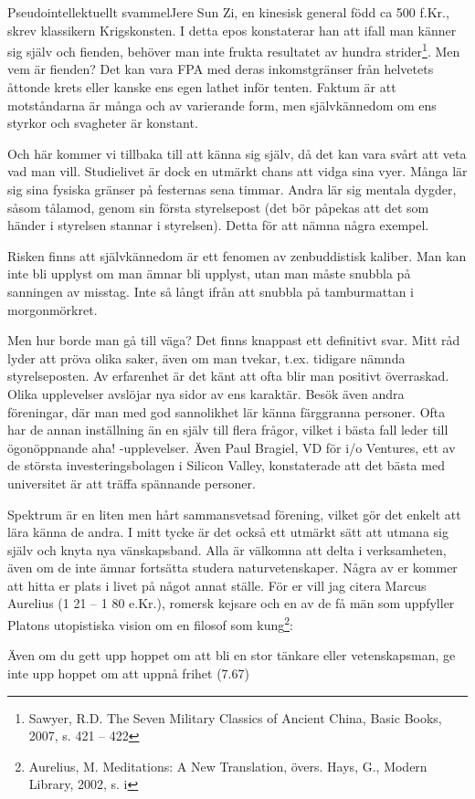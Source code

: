 \documentclass{spektraklet}
\begin{document}
\begin{artikel}{Pseudointellektuellt svammel}{Jere}
Sun Zi, en kinesisk general född ca 500 f.Kr., skrev klassikern Krigskonsten. I detta epos konstaterar han att ifall man känner sig själv och fienden, behöver man inte frukta resultatet av hundra strider\footnote{Sawyer, R.D. The Seven Military Classics of Ancient China, Basic Books, 2007, s. 421 – 422}. Men vem är fienden? Det kan vara FPA med deras inkomstgränser från helvetets åttonde krets eller kanske ens egen lathet inför tenten. Faktum är att motståndarna är många och av varierande form, men självkännedom om ens styrkor och svagheter är konstant.

Och här kommer vi tillbaka till att känna sig själv, då det kan vara svårt att veta vad man vill. Studielivet är dock en utmärkt chans att vidga sina vyer. Många lär sig sina fysiska gränser på festernas sena timmar. Andra lär sig mentala dygder, såsom tålamod, genom sin första styrelsepost (det bör påpekas att det som händer i styrelsen stannar i styrelsen). Detta för att nämna några exempel.

Risken finns att självkännedom är ett fenomen av zenbuddistisk kaliber. Man kan inte bli upplyst om man ämnar bli upplyst, utan man måste snubbla på sanningen av misstag. Inte så långt ifrån att snubbla på tamburmattan i morgonmörkret.

Men hur borde man gå till väga? Det finns knappast ett definitivt svar. Mitt råd lyder att pröva olika saker, även om man tvekar, t.ex. tidigare nämnda styrelseposten. Av erfarenhet är det känt att ofta blir man positivt överraskad. Olika upplevelser avslöjar nya sidor av ens karaktär. Besök även andra föreningar, där man med god sannolikhet lär känna färggranna personer. Ofta har de annan inställning än en själv till flera frågor, vilket i bästa fall leder till ögonöppnande aha! -upplevelser. Även Paul Bragiel, VD för i/o Ventures, ett av de största investeringsbolagen i Silicon Valley, konstaterade att det bästa med universitet är att träffa spännande personer.

Spektrum är en liten men hårt sammansvetsad förening, vilket gör det enkelt att lära känna de andra. I mitt tycke är det också ett utmärkt sätt att utmana sig själv och knyta nya vänskapsband. Alla är välkomna att delta i verksamheten, även om de inte ämnar fortsätta studera naturvetenskaper. Några av er kommer att hitta er plats i livet på något annat ställe. För er vill jag citera Marcus Aurelius (1 21 – 1 80 e.Kr.), romersk kejsare och en av de få män som uppfyller Platons utopistiska vision om en filosof som kung\footnote{Aurelius, M. Meditations: A New Translation, övers. Hays, G., Modern Library, 2002, s. i}: 

Även om du gett upp hoppet om att bli en stor tänkare eller vetenskapsman, ge inte upp hoppet om att uppnå frihet (7.67)

\end{artikel}
\end{document}
